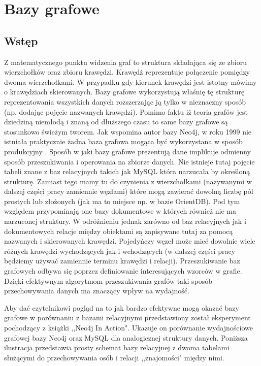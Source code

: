 \documentclass[brudnopis]{xmgr}
\begin{document}
\chapter{Bazy grafowe}

\section{Wstęp}

Z matematycznego punktu widzenia \cite{Szepietowski:2010:MD} graf to struktura składająca się ze zbioru wierzchołków oraz zbioru krawędzi. Krawędź reprezentuje połączenie pomiędzy dwoma wierzchołkami. W przypadku gdy kierunek krawędzi jest istotny mówimy o krawędziach skierowanych. Bazy grafowe wykorzystują właśnię tę strukturę reprezentowania wszystkich danych rozszerzając ją tylko w nieznaczny sposób (np. dodając pojęcie nazwanych krawędzi). Pomimo faktu iż teoria grafów jest dziedziną niemłodą i znaną od dłuższego czasu to same bazy grafowe są stosunkowo świeżym tworem. Jak wspomina autor bazy Neo4j, w roku 1999 nie istniała praktycznie żadna baza grafowa mogąca być wykorzystana w sposób produkcyjny \cite{Robinson:2013:GD}. Sposób w jaki bazy grafowe prezentują dane implikuje odmienny sposób przeszukiwania i operowania na zbiorze danych. Nie istnieje tutaj pojęcie tabeli znane z baz relacyjnych takich jak MySQL która narzucała by określoną strukturę. Zamiast tego mamy tu do czynienia z wierzchołkami (nazywanymi w dalszej części pracy zamiennie węzłami) które mogą zawierać dowolną liczbę pól prostych lub złożonych (jak ma to miejsce np. w bazie OrientDB). Pod tym względem przypominają one bazy dokumentowe w których również nie ma narzuconej struktury. W odróżnieniu jednak zarówno od baz relacyjnych jak i dokumentowych relacje między obiektami są zapisywane tutaj za pomocą nazwanych i skierowanych krawędzi. Pojedyńczy węzeł może mieć dowolnie wiele różnych krawędzi wychodzących jak i wchodzących (w dalszej części pracy będziemy używać zamiennie terminu krawędzi i relacji). Przeszukiwanie baz grafowych odbywa się poprzez definiowanie interesujących wzorców w grafie. Dzięki efektywnym algorytmom przeszukiwania grafów taki sposób przechowywania danych ma znaczący wpływ na wydajność.

Aby dać czytelnikowi pogląd na to jak bardzo efektywne mogą okazać bazy grafowe w porównaniu z bazami relacyjnymi przedstawiony został eksperyment pochodzący z książki ,,Neo4j In Action"\cite{neo4jinaction}. Ukazuje on porównanie wydajnościowe grafowej bazy Neo4j oraz MySQL dla analogicznej struktury danych. Poniższa ilustracja przedstawia prosty schemat bazy relacyjnej z dwoma tabelami służącymi do przechowywania osób i relacji ,,znajomości" między nimi.
\end{document}
